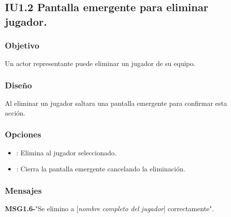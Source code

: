 
\subsection{IU1.2 Pantalla emergente para eliminar jugador.}

\subsubsection{Objetivo}
	Un actor representante puede eliminar un jugador de su equipo.

\subsubsection{Diseño}
  Al eliminar un jugador saltara una pantalla emergente para confirmar esta acción.

\subsubsection{Opciones}
\begin{itemize}
  \item {}: Elimina al jugador seleccionado.
  \item {}: Cierra la pantalla emergente cancelando la eliminación.
\end{itemize}

\subsubsection{Mensajes}
	\begin{Citemize}
		\item {\bf MSG1.6-}"Se elimino a [{\em nombre completo del jugador}] correctamente".
	\end{Citemize}